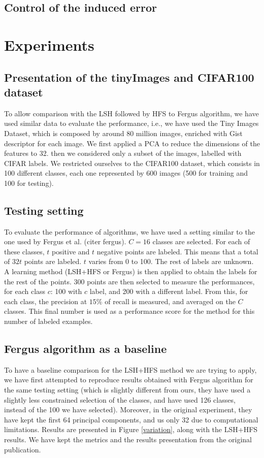 \documentclass{article} %
\begin{document}
\subsection{Control of the induced error}

\section{Experiments}
\subsection{Presentation of the tinyImages and CIFAR100 dataset}
To allow comparison with the LSH followed by HFS to Fergus algorithm, we have used similar data to evaluate the performance, i.e., we have used the Tiny Images Dataset, which is composed by around 80 million images, enriched with Gist descriptor for each image. We first applied a PCA to reduce the dimensions of the features to 32. then we considered only a subset of the images, labelled with CIFAR labels. We restricted ourselves to the CIFAR100 dataset, which consists in 100 different classes, each one represented by 600 images (500 for training and 100 for testing).
 
\subsection{Testing setting}
To evaluate the performance of algorithms, we have used a setting similar to the one used by Fergus et al. (citer fergus). $C=16$ classes are selected. For each of these classes, $t$ positive and $t$ negative points are labeled. This means that a total of $32t$ points are labeled. $t$ varies from 0 to 100. The rest of labels are unknown. A learning method (LSH+HFS or Fergus) is then applied to obtain the labels for the rest of the points. 300 points are then selected to measure the performances, for each class $c$: 100 with $c$ label, and 200 with a different label. From this, for each class, the precision at $15\%$ of recall is measured, and averaged on the $C$ classes. This final number is used as a performance score for the method for this number of labeled examples.

 
\subsection{Fergus algorithm as a baseline}
To have a baseline comparison for the LSH+HFS method we are trying to apply, we have first attempted to reproduce results obtained with Fergus algorithm for the same testing setting (which is slightly different from ours, they have used a slightly less constrained selection of the classes, and have used 126 classes, instead of the 100 we have selected). Moreover, in the original experiment, they have kept the first 64 principal components, and us only 32 due to computational limitations. Results are presented in Figure \ref{variation}, along with the LSH+HFS results. We have kept the metrics and the results presentation from the original publication.
\end{document}
